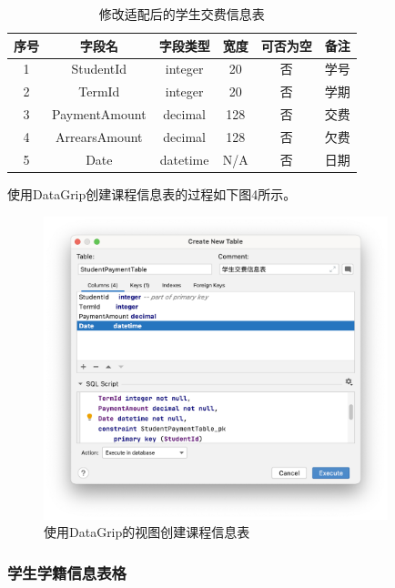\documentclass[a4paper,UTF8,heading=false,12pt]{article}
\begin{document}
    \begin{table}[htbp]
        \begin{center}
            \begin{tabular}{@{}cccccc@{}}
                \toprule
                序号 & 字段名         & 字段类型    & 宽度  & 可否为空 & 备注   \\ \midrule
                1  & StudentId   & integer & 20  & 否    & 学号   \\
                2  & TermId & integer & 20 & 否    & 学期   \\
                3  & PaymentAmount     & decimal & 128  & 否    & 交费   \\ 
                4  & ArrearsAmount     & decimal & 128  & 否    & 欠费   \\ 
                5  & Date     & datetime & N/A  & 否    & 日期   \\ 
                \bottomrule
                \end{tabular}
                \caption{修改适配后的学生交费信息表}
        \end{center}
    \end{table}

    使用DataGrip创建课程信息表的过程如下图4所示。

    \begin{figure}[htbp]
        \centering
        \includegraphics[width=10cm]{../Images/StudentPaymentTable.png}
        \caption{使用DataGrip的视图创建课程信息表}
    \end{figure}

    \subsubsection{学生学籍信息表格}
\end{document}
